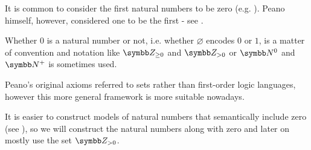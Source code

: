 \begin{remark}\label{remark:peano_arithmetic_zero}
  It is common to consider the first natural numbers to be zero (e.g. \cite[67]{Enderton1977}). Peano himself, however, considered one to be the first - see \cite[1]{Peano1889}.

  Whether \( 0 \) is a natural number or not, i.e. whether \( \varnothing \) encodes \( 0 \) or \( 1 \), is a matter of convention and notation like \( \BZ_{\geq 0} \) and \( \BZ_{>0} \) or \( \BN^0 \) and \( \BN^+ \) is sometimes used.

  Peano's original axioms referred to sets rather than first-order logic languages, however this more general framework is more suitable nowadays.

  It is easier to construct models of natural numbers that semantically include zero (see ), so we will construct the natural numbers along with zero and later on mostly use the set \( \BZ_{>0} \).
\end{remark}

